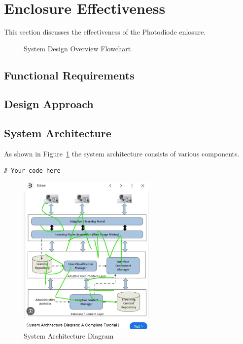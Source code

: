 \section{Enclosure Effectiveness}
This section discusses the effectiveness of the Photodiode enlosure.

\begin{figure}[H]
    \centering
    \scalebox{0.8}{ %
        
    }
    \caption{System Design Overview Flowchart}
    \label{fig:decriptiveLabel5} %
\end{figure}

\subsection{Functional Requirements}

\subsection{Design Approach}

\subsection{System Architecture}
As shown in Figure~\ref{fig:decriptiveLabel5} the system architecture consists of various components.

\begin{lstlisting}[style=cstyle, caption=System Architecture Code Example, label=lst:SystemArchitecture4]
# Your code here
\end{lstlisting}

\begin{figure}[htbp] %
    \centering
    \includegraphics[width=0.6\textwidth]{figures/results/system_architecture.jpg}
    \caption{System Architecture Diagram}
    \label{fig:system-architecture22}
\end{figure}
